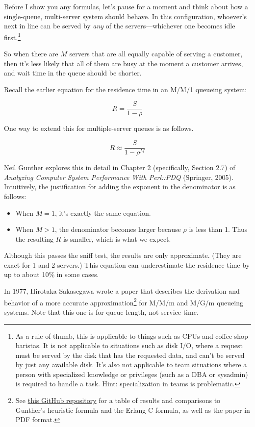 \documentclass{vivid_layout_pdf}
\begin{document}
Before I show you any formulas, let's pause for a moment and think about how a single-queue, multi-server system should behave. In this configuration, whoever's next in line can be served by {\itshape any} of the servers---whichever one becomes idle first.\footnote{As a rule of thumb, this is applicable to things such as CPUs and coffee shop baristas. It is not applicable to situations such as disk I/O, where a request must be served by the disk that has the requested data, and can't be served by just any available disk. It's also not applicable to team situations where a person with specialized knowledge or privileges (such as a DBA or sysadmin) is required to handle a task. Hint: specialization in teams is problematic.}

So when there are \( M \) servers that are all equally capable of serving a customer, then it's less likely that all of them are busy at the moment a customer arrives, and wait time in the queue should be shorter. 

Recall the earlier equation for the residence time in an M/M/1 queueing system:

\[
  R = \frac{S}{1 - \rho}
\]

One way to extend this for multiple-server queues is as follows.

\[
  R \approx \frac{S}{ 1-\rho^M }
\]

Neil Gunther explores this in detail in Chapter 2 (specifically, Section 2.7) of {\itshape Analyzing Computer System Performance With Perl::PDQ} (Springer, 2005). Intuitively, the justification for adding the exponent in the denominator is as follows:

\begin{itemize}
\item When \( M=1 \), it's exactly the same equation.
\item When \( M > 1 \), the denominator becomes larger because \( \rho \) is less than 1. Thus the resulting \( R \) is smaller, which is what we expect.
\end{itemize}

Although this passes the sniff test, the results are only approximate. (They are exact for 1 and 2 servers.) This equation can underestimate the residence time by up to about 10\% in some cases.

In 1977, Hirotaka Sakasegawa wrote a paper that describes the derivation and behavior of a more accurate approximation\footnote{See \href{https://github.com/VividCortex/approx-queueing-theory}{this GitHub repository} for a table of results and comparisons to Gunther's heuristic formula and the Erlang C formula, as well as the paper in PDF format.} for M/M/m and M/G/m queueing systems. Note that this one is for queue length, not service time.
\end{document}
